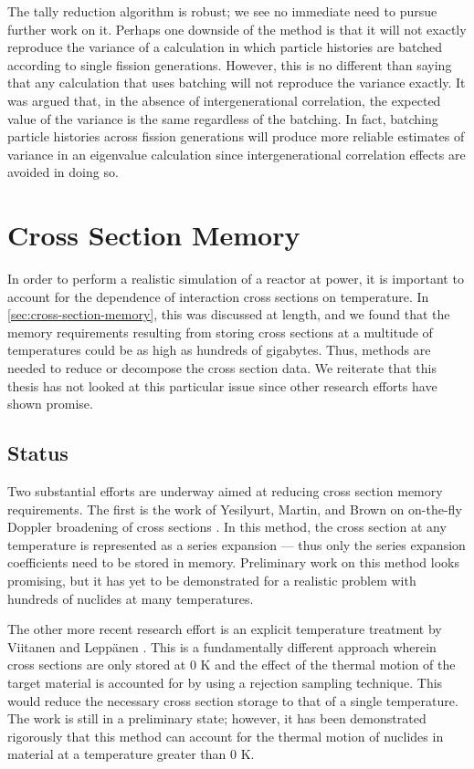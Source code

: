 The tally reduction algorithm is robust; we see no immediate need to pursue
further work on it. Perhaps one downside of the method is that it will not
exactly reproduce the variance of a calculation in which particle histories are
batched according to single fission generations. However, this is no different
than saying that any calculation that uses batching will not reproduce the
variance exactly. It was argued that, in the absence of intergenerational
correlation, the expected value of the variance is the same regardless of the
batching. In fact, batching particle histories across fission generations will
produce more reliable estimates of variance in an eigenvalue calculation since
intergenerational correlation effects are avoided in doing so.

\section{Cross Section Memory}

In order to perform a realistic simulation of a reactor at power, it is
important to account for the dependence of interaction cross sections on
temperature. In \autoref{sec:cross-section-memory}, this was discussed at
length, and we found that the memory requirements resulting from storing cross
sections at a multitude of temperatures could be as high as hundreds of
gigabytes. Thus, methods are needed to reduce or decompose the cross section
data. We reiterate that this thesis has not looked at this particular issue
since other research efforts have shown promise.

\subsection{Status}

Two substantial efforts are underway aimed at reducing cross section memory
requirements. The first is the work of Yesilyurt, Martin, and Brown on
on-the-fly Doppler broadening of cross sections \cite{nse-yesilyurt-2012,
  trans-brown-2012}. In this method, the cross section at any temperature is
represented as a series expansion --- thus only the series expansion
coefficients need to be stored in memory. Preliminary work on this method looks
promising, but it has yet to be demonstrated for a realistic problem with
hundreds of nuclides at many temperatures.

The other more recent research effort is an explicit temperature treatment by
Viitanen and Leppänen \cite{nse-viitanen-2012}. This is a fundamentally
different approach wherein cross sections are only stored at 0 K and the effect
of the thermal motion of the target material is accounted for by using a
rejection sampling technique. This would reduce the necessary cross section
storage to that of a single temperature. The work is still in a preliminary
state; however, it has been demonstrated rigorously that this method can account
for the thermal motion of nuclides in material at a temperature greater than 0
K.

